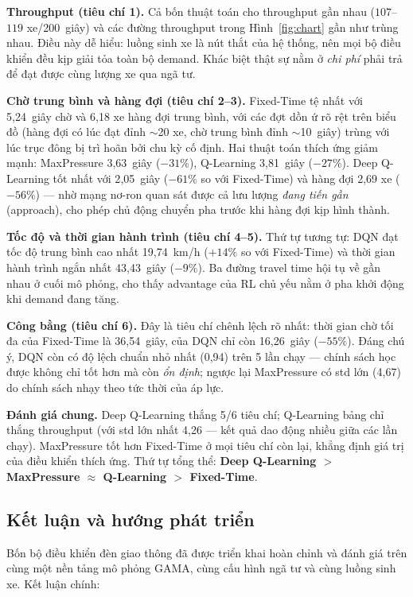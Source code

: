 \documentclass[11pt,a4paper]{article}
\begin{document}
\textbf{Throughput (tiêu chí 1).} Cả bốn thuật toán cho throughput gần nhau
($107$--$119$ xe/200~giây) và các đường throughput trong Hình~\ref{fig:chart} gần
như trùng nhau. Điều này dễ hiểu: luồng sinh xe là nút thắt của hệ thống, nên mọi
bộ điều khiển đều kịp giải tỏa toàn bộ demand. Khác biệt thật sự nằm ở \emph{chi
phí} phải trả để đạt được cùng lượng xe qua ngã tư.

\textbf{Chờ trung bình và hàng đợi (tiêu chí 2--3).} Fixed-Time tệ nhất với
5{,}24~giây chờ và 6{,}18 xe hàng đợi trung bình, với các đợt dồn ứ rõ rệt trên
biểu đồ (hàng đợi có lúc đạt đỉnh $\sim$20 xe, chờ trung bình đỉnh $\sim$10~giây)
trùng với lúc trục đông bị trì hoãn bởi chu kỳ cố định. Hai thuật toán thích ứng
giảm mạnh: MaxPressure 3{,}63~giây ($-31\%$), Q-Learning 3{,}81~giây ($-27\%$).
Deep Q-Learning tốt nhất với 2{,}05~giây ($-61\%$ so với Fixed-Time) và hàng đợi
2{,}69 xe ($-56\%$) --- nhờ mạng nơ-ron quan sát được cả lưu lượng \emph{đang tiến
gần} (approach), cho phép chủ động chuyển pha trước khi hàng đợi kịp hình thành.

\textbf{Tốc độ và thời gian hành trình (tiêu chí 4--5).} Thứ tự tương tự:
DQN đạt tốc độ trung bình cao nhất 19{,}74~km/h ($+14\%$ so với Fixed-Time) và
thời gian hành trình ngắn nhất 43{,}43~giây ($-9\%$). Ba đường travel time hội tụ
về gần nhau ở cuối mô phỏng, cho thấy advantage của RL chủ yếu nằm ở pha khởi động
khi demand đang tăng.

\textbf{Công bằng (tiêu chí 6).} Đây là tiêu chí chênh lệch rõ nhất: thời gian
chờ tối đa của Fixed-Time là 36{,}54~giây, của DQN chỉ còn 16{,}26~giây
($-55\%$). Đáng chú ý, DQN còn có độ lệch chuẩn nhỏ nhất (0{,}94) trên 5 lần chạy
--- chính sách học được không chỉ tốt hơn mà còn \emph{ổn định}; ngược lại
MaxPressure có std lớn (4{,}67) do chính sách nhạy theo tức thời của áp lực.

\textbf{Đánh giá chung.} Deep Q-Learning thắng 5/6 tiêu chí; Q-Learning bảng chỉ
thắng throughput (với std lớn nhất 4{,}26 --- kết quả dao động nhiều giữa các lần
chạy). MaxPressure tốt hơn Fixed-Time ở mọi tiêu chí còn lại, khẳng định giá trị
của điều khiển thích ứng. Thứ tự tổng thể: \textbf{Deep Q-Learning $>$ MaxPressure
$\approx$ Q-Learning $>$ Fixed-Time}.

\subsection{Kết luận và hướng phát triển}

Bốn bộ điều khiển đèn giao thông đã được triển khai hoàn chỉnh và đánh giá trên
cùng một nền tảng mô phỏng GAMA, cùng cấu hình ngã tư và cùng luồng sinh xe. Kết
luận chính:
\end{document}
